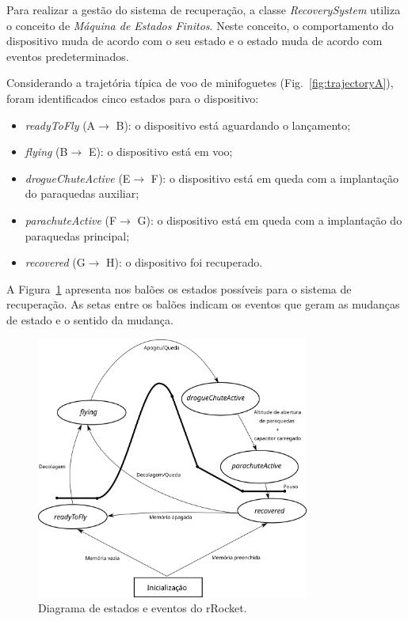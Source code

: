 \documentclass[12pt,a4paper]{article}
\begin{document}
Para realizar a gestão do sistema de recuperação, a classe \textit{RecoverySystem} utiliza o conceito de \textit{Máquina de Estados Finitos}. Neste conceito, o comportamento do dispositivo muda de acordo com o seu estado e o estado muda de acordo com eventos predeterminados. 

Considerando a trajetória típica de voo de minifoguetes (Fig.~\ref{fig:trajectoryA}), foram identificados cinco estados para o dispositivo:
\begin{itemize}
	\item \textit{readyToFly} (A$\to$ B): o dispositivo está aguardando o lançamento;
	\item \textit{flying} (B$\to$ E): o dispositivo está em voo;
	\item \textit{drogueChuteActive} (E$\to$ F): o dispositivo está em queda com a implantação do paraquedas auxiliar;
	\item \textit{parachuteActive} (F$\to$ G): o dispositivo está em queda com a implantação do paraquedas principal;
	\item \textit{recovered} (G$\to$ H): o dispositivo foi recuperado.
\end{itemize} 

A Figura~\ref{fig:states} apresenta nos balões os estados possíveis para o sistema de recuperação. As setas entre os balões indicam os eventos que geram as mudanças de estado e o sentido da mudança.
\begin{figure}[!ht]
	\centering
	\includegraphics[width=0.8\textwidth]{./fig/FSM}
	\caption{Diagrama de estados e eventos do rRocket.}
	\label{fig:states}
\end{figure}
\end{document}
